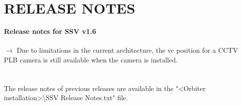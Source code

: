 \documentclass[Space_Shuttle_Vessel_Manual.tex]{subfiles}
\begin{document}
\section{RELEASE NOTES}
\label{sec:release-notes}
\noindent
\textbf{Release notes for SSV v1.6}\\\\
$\rightarrow$ Due to limitations in the current architecture, the vc position for a CCTV PLB camera is still available when the camera is installed.\\
\\
\\
The release notes of previous releases are available in the "<Orbiter installation>\textbackslash SSV Release Notes.txt" file.
\end{document}
